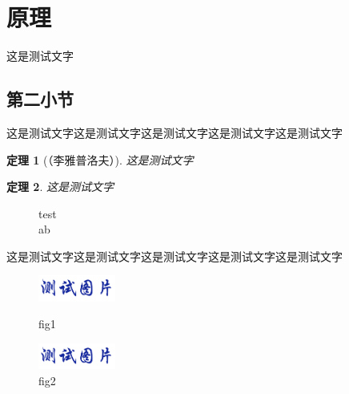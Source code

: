\documentclass[UTF8,zihao=-4,twoside]{ctexart}
\theoremstyle{thmstyle}
\newtheorem{dingli}{定理}[section]
\newcommand{\sect}[1]{\vfill\clearpage\setcounter{figure}{0}\setcounter{table}{0}\setcounter{equation}{0}\section{#1}}
\newcommand{\figstyle}{\centering\vspace{-0.1cm}\setlength{\abovecaptionskip}{0.2cm}\setlength{\belowcaptionskip}{-0.5cm}}
\begin{document}
    \sect{原理}
    这是测试文字
        \subsection{第二小节}
        这是测试文字这是测试文字这是测试文字这是测试文字这是测试文字
        \begin{dingli}[（李雅普洛夫）]
          这是测试文字
        \end{dingli}

        \begin{dingli}
          这是测试文字
        \end{dingli}

            \begin{figure}[H]
                \figstyle
                \caption{test\protect\\ ab}
            \end{figure}

        这是测试文字这是测试文字这是测试文字这是测试文字这是测试文字
            \begin{figure}[H]
                \figstyle
                \begin{minipage}[t]{0.3\textwidth}
                    \centering
            	    \includegraphics [width=1in]{figures/test.png}
                    \caption{fig1}
                \end{minipage}
                \begin{minipage}[t]{0.3\textwidth}
                    \centering
            	    \includegraphics [width=1in]{figures/test.png}
                    \caption{fig2}
                \end{minipage}
            \end{figure}
\end{document}
